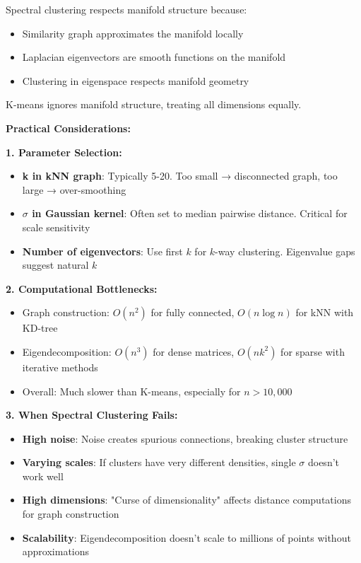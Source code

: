 \documentclass[12pt]{article}
\begin{document}
\begin{explanation}
Spectral clustering respects manifold structure because:
\begin{itemize}
    \item Similarity graph approximates the manifold locally
    \item Laplacian eigenvectors are smooth functions on the manifold
    \item Clustering in eigenspace respects manifold geometry
\end{itemize}

K-means ignores manifold structure, treating all dimensions equally.

\textbf{Practical Considerations:}

\textbf{1. Parameter Selection:}
\begin{itemize}
    \item \textbf{k in kNN graph}: Typically 5-20. Too small → disconnected graph, too large → over-smoothing
    \item \textbf{$\sigma$ in Gaussian kernel}: Often set to median pairwise distance. Critical for scale sensitivity
    \item \textbf{Number of eigenvectors}: Use first $k$ for $k$-way clustering. Eigenvalue gaps suggest natural $k$
\end{itemize}

\textbf{2. Computational Bottlenecks:}
\begin{itemize}
    \item Graph construction: $O(n^2)$ for fully connected, $O(n \log n)$ for kNN with KD-tree
    \item Eigendecomposition: $O(n^3)$ for dense matrices, $O(nk^2)$ for sparse with iterative methods
    \item Overall: Much slower than K-means, especially for $n > 10,000$
\end{itemize}

\textbf{3. When Spectral Clustering Fails:}
\begin{itemize}
    \item \textbf{High noise}: Noise creates spurious connections, breaking cluster structure
    \item \textbf{Varying scales}: If clusters have very different densities, single $\sigma$ doesn't work well
    \item \textbf{High dimensions}: "Curse of dimensionality" affects distance computations for graph construction
    \item \textbf{Scalability}: Eigendecomposition doesn't scale to millions of points without approximations
\end{itemize}


\end{explanation}
\end{document}
